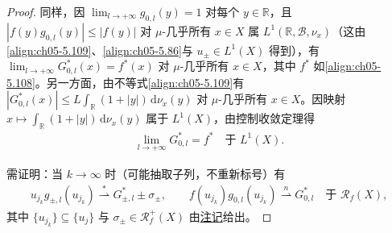\documentclass[../../main.tex]{subfiles}
\begin{document}
\begin{proof}
同样，因 $\lim_{l\to+\infty}g_{0,l}(y)=1$ 对每个 $y\in\mathbb{R}$，且 $|f(y)g_{0,l}(y)|\leqslant|f(y)|$ 对 $\mu$-几乎所有 $x\in X$ 属 $L^1(\mathbb{R},\mathscr{B},\nu_x)$（这由\eqref{align:ch05-5.109}、\eqref{align:ch05-5.86}与 $u_\pm\in L^1(X)$ 得到），有 $\lim_{l\to+\infty}G^*_{0,l}(x)=f^*(x)$ 对 $\mu$-几乎所有 $x\in X$，其中 $f^*$ 如\eqref{align:ch05-5.108}。另一方面，由不等式\eqref{align:ch05-5.109}有 $|G^*_{0,l}(x)|\leqslant L\int_{\mathbb{R}}(1+|y|)\,\mathrm{d}\nu_x(y)$ 对 $\mu$-几乎所有 $x\in X$。因映射 $x\mapsto\int_{\mathbb{R}}(1+|y|)\,\mathrm{d}\nu_x(y)$ 属于 $L^1(X)$，由控制收敛定理得
\begin{align}
\lim_{l\to+\infty}G^*_{0,l}=f^*\quad\text{于 }L^1(X).\label{align:ch05-5.114}
\end{align}

需证明：当 $k\to\infty$ 时（可能抽取子列，不重新标号）有
\begin{align}
u_{j_k}g_{\pm,l}(u_{j_k})\stackrel{*}{\rightharpoonup}G^*_{\pm,l}\pm\sigma_\pm,
\qquad
f(u_{j_k})g_{0,l}(u_{j_k})\stackrel{n}{\rightharpoonup}G^*_{0,l}
\quad\text{于 }\mathscr{R}_f(X),\label{align:ch05-5.115}
\end{align}
其中 $\{u_{j_k}\}\subseteq\{u_j\}$ 与 $\sigma_\pm\in\mathscr{R}^+_f(X)$ 由\hyperref[remark:ch05-5.4.5]{注记}给出。


\end{proof}
\end{document}
